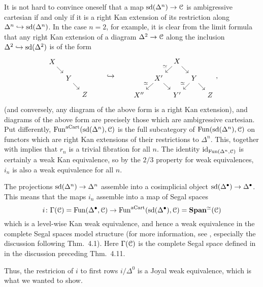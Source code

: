\documentclass[main.tex]{subfiles}
\begin{document}
\begin{example}
  It is not hard to convince oneself that a map $\mathrm{sd}(\Delta^{n}) \to \mathcal{C}$ is ambigressive cartesian if and only if it is a right Kan extension of its restriction along $\Delta^{n} \hookrightarrow \mathrm{sd}(\Delta^{n})$. In the case $n = 2$, for example, it is clear from the limit formula that any right Kan extension of a diagram $\Delta^{2} \to \mathcal{C}$ along the inclusion $\Delta^{2} \hookrightarrow \mathrm{sd}(\Delta^{2})$ is of the form
  \begin{equation*}
    \begin{tikzcd}[row sep=small, column sep=tiny]
      X
      \arrow[dr]
      \\
      & Y
      \arrow[dr]
      \\
      && Z
    \end{tikzcd}
    \qquad \hookrightarrow \qquad
    \begin{tikzcd}[row sep=small, column sep=tiny]
      && X
      \arrow[dl, swap, "\simeq"]
      \arrow[dr]
      \\
      & X'
      \arrow[dl, swap, "\simeq"]
      \arrow[dr]
      && Y
      \arrow[dl, swap, "\simeq"]
      \arrow[dr]
      \\
      X''
      && Y'
      && Z
    \end{tikzcd},
  \end{equation*}
  (and conversely, any diagram of the above form is a right Kan extension), and diagrams of the above form are precisely those which are ambigressive cartesian. Put differently, $\mathrm{Fun}^{\mathrm{aCart}}(\mathrm{sd}(\Delta^{n}), \mathcal{C})$ is the full subcategory of $\mathrm{Fun}(\mathrm{sd}(\Delta^{n}), \mathcal{C})$ on functors which are right Kan extensions of their restrictions to $\Delta^{n}$. This, together with \cite[Prop.\ 4.3.2.15]{highertopostheory} implies that $r_{n}$ is a trivial fibration for all $n$. The identity $\mathrm{id}_{\mathrm{Fun}(\Delta^{n}, \mathcal{C})}$ is certainly a weak Kan equivalence, so by the $2/3$ property for weak equivalences, $i_{n}$ is also a weak equivalence for all $n$.

  The projections $\mathrm{sd}(\Delta^{n}) \to \Delta^{n}$ assemble into a cosimplicial object $\mathrm{sd}(\Delta^{\bullet}) \to \Delta^{\bullet}$. This means that the maps $i_{n}$ assemble into a map of Segal spaces
  \begin{equation*}
    i\colon \Gamma(\mathcal{C}) = \mathrm{Fun}(\Delta^{\bullet}, \mathcal{C}) \to \mathrm{Fun}^{\mathrm{aCart}}(\mathrm{sd}(\Delta^{\bullet}), \mathcal{C}) = \mathbf{Span}^{\simeq}(\mathcal{C})
  \end{equation*}
  which is a level-wise Kan weak equivalence, and hence a weak equivalence in the complete Segal spaces model structure (for more information, see \cite{qcats_vs_segal_spaces}, especially the discussion following Thm.\ 4.1). Here $\Gamma(\mathcal{C})$ is the complete Segal space defined in \cite{qcats_vs_segal_spaces} in the discussion preceding Thm.\ 4.11.

  Thus, the restricion of $i$ to first rows $i / \Delta^{0}$ is a Joyal weak equivalence, which is what we wanted to show.
\end{example}
\end{document}
